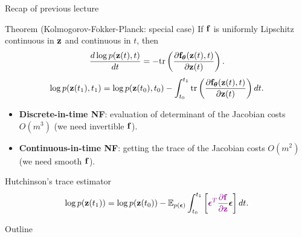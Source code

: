 \begin{frame}{Recap of previous lecture}
	\begin{block}{Theorem (Kolmogorov-Fokker-Planck: special case)}
		If $\mathbf{f}$ is uniformly Lipschitz continuous in $\mathbf{z}$ and continuous in $t$, then
		\[
			\frac{d \log p(\mathbf{z}(t), t)}{d t} = - \text{tr} \left( \frac{\partial \mathbf{f}_{\boldsymbol{\theta}}(\mathbf{z}(t), t)}{\partial \mathbf{z}(t)} \right).
		\]
		\[
			\log p(\mathbf{z}(t_1), t_1) = \log p(\mathbf{z}(t_0), t_0) - \int_{t_0}^{t_1} \text{tr}  \left( \frac{\partial \mathbf{f}_{\boldsymbol{\theta}}(\mathbf{z}(t), t)}{\partial \mathbf{z}(t)} \right) dt.
		\]
	\end{block}
	\vspace{-0.3cm}
	\begin{itemize}
		\item \textbf{Discrete-in-time NF}: evaluation of determinant of the Jacobian costs $O(m^3)$ (we need invertible $\mathbf{f}$).
		\item \textbf{Continuous-in-time NF}: getting the trace of the Jacobian costs $O(m^2)$ (we need smooth $\mathbf{f}$).
	\end{itemize}
	\begin{block}{Hutchinson's trace estimator}
		\vspace{-0.3cm}
		\[
  \log p(\mathbf{z}(t_1)) = \log p(\mathbf{z}(t_0)) - \mathbb{E}_{p(\boldsymbol{\epsilon})} \int_{t_0}^{t_1} \left[ {\color{violet}\boldsymbol{\epsilon}^T \frac{\partial \mathbf{f}}{\partial \mathbf{z}}} \boldsymbol{\epsilon} \right] dt.
		\]
	\end{block}
\end{frame}
\begin{frame}{Outline}
	\tableofcontents
\end{frame}
